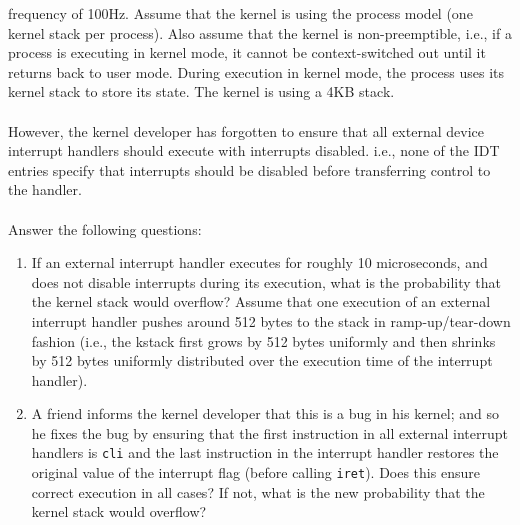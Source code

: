 \begin{enumerate}
frequency of 100Hz. Assume that the kernel is using the process model (one kernel
stack per process). Also assume that the kernel is non-preemptible, i.e., if a process
is executing in kernel mode, it cannot be context-switched out until it returns back to
user mode. During execution in kernel mode, the process uses its kernel stack to store
its state. The kernel is using a 4KB stack.\\\\
However, the kernel developer has forgotten to ensure that all external device interrupt
handlers should execute with interrupts disabled. i.e., none of the IDT entries specify
that interrupts should be disabled before transferring control to the handler.\\\\
Answer the following questions:
\begin{enumerate}
\item If an external interrupt handler executes for roughly 10 microseconds, and does
not disable interrupts during its execution, what is the probability that the kernel
stack would overflow? Assume that one execution
of an external interrupt handler pushes around 512 bytes to the stack in ramp-up/tear-down
fashion (i.e., the kstack first grows by 512 bytes uniformly and then shrinks by 512
bytes uniformly distributed over the execution time of the interrupt handler).
\item A friend informs the kernel developer that this is a bug in
his kernel; and so he
fixes the bug by ensuring that the first instruction in all external interrupt handlers
is {\tt cli} and the last instruction in the interrupt handler
restores the original value of the interrupt flag (before calling {\tt iret}). Does this
ensure correct execution in all cases? If not, what is the new probability that the
kernel stack would overflow?
\end{enumerate}


\end{enumerate}
